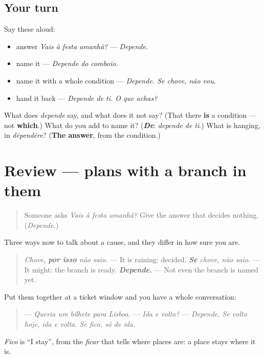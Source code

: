 \subsection*{Your turn}
Say these aloud:

\begin{itemize}
\raggedright
  \item answer \emph{Vais à festa amanhã?} — \emph{Depende.}
  \item name it — \emph{Depende do comboio.}
  \item name it with a whole condition — \emph{Depende. Se chove, não vou.}
  \item hand it back — \emph{Depende de ti. O que achas?}
\end{itemize}

\begin{tcolorbox}[breakable,colback=teal!4,colframe=teal!35!black,title={Before you move on}]
What does \emph{depende} say, and what does it not say? (That there \textbf{is} a condition — not \textbf{which}.) What do you add to name it? (\emph{\textbf{De}}: \emph{depende de ti}.) What is hanging, in \emph{dēpendēre}? (\textbf{The answer}, from the condition.)
\end{tcolorbox}
\section[(review)]{Review — plans with a branch in them}

\label{lesson:PT-C267-revisao-condicoes}



\begin{quote}
Someone asks \emph{Vais à festa amanhã?} Give the answer that decides nothing. (\emph{Depende.})
\end{quote}

\begin{grammarlens}[title={What you've built}]
Three ways now to talk about a cause, and they differ in how sure you are.

\begin{quote}
\emph{Chove, \textbf{por isso} não saio.} — It is raining: decided. \emph{\textbf{Se} chove, não saio.} — It might: the branch is ready. \emph{\textbf{Depende.}} — Not even the branch is named yet.
\end{quote}

Put them together at a ticket window and you have a whole conversation:

\begin{quote}
— \emph{Queria um bilhete para Lisboa.} — \emph{Ida e volta?} — \emph{Depende. Se volto hoje, ida e volta. Se fico, só de ida.}
\end{quote}

\emph{Fico} is \textquotedblleft{}I stay\textquotedblright{}, from the \emph{ficar} that tells where places are: a place stays where it is.
\end{grammarlens}

